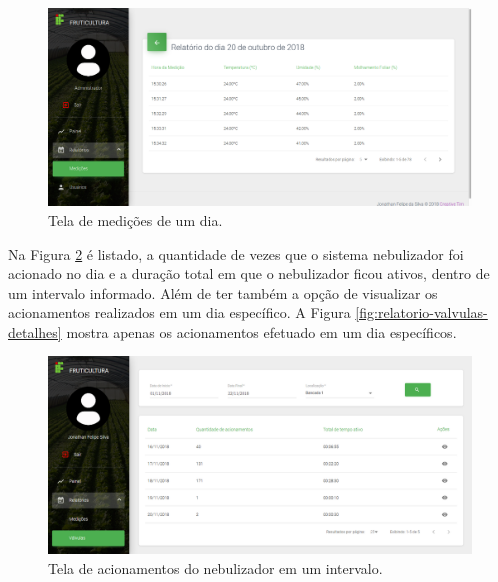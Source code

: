 \begin{figure}[H]
    \centering
    \includegraphics[scale=0.3]{04-figuras/tela_relatorio_medicoes_dia.png}
    \caption{Tela de medições de um dia.}
    \vspace{-\baselineskip}
    \label{fig:tela-relatorio-medicoes-dia}
\end{figure}

Na Figura \ref{fig:relatorio-valvulas} é listado, a quantidade de vezes que o sistema nebulizador foi acionado no dia e a duração total em que o nebulizador ficou ativos, dentro de um intervalo informado. Além de ter também a opção de visualizar os acionamentos realizados em um dia específico. A Figura \ref{fig:relatorio-valvulas-detalhes} mostra apenas os acionamentos efetuado em um dia específicos.

\begin{figure}[H]
    \centering
    \includegraphics[scale=0.3]{04-figuras/relatorio-valvulas.png}
    \caption{Tela de acionamentos do nebulizador em um intervalo.}
    \vspace{-\baselineskip}
    \label{fig:relatorio-valvulas}
\end{figure}

